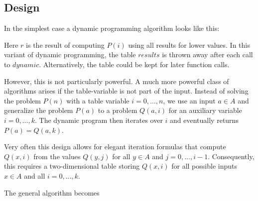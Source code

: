 \subsection{Design}

In the simplest case a dynamic programming algorithm looks like this:

\begin{acode}
\end{acode}

Here $r$ is the result of computing $P(i)$ using all results for lower values.
In this variant of dynamic programming, the table $results$ is thrown away after each call to $dynamic$.
Alternatively, the table could be kept for later function calls.

However, this is not particularly powerful.
A much more powerful class of algorithms arises if the table-variable is not part of the input.
Instead of solving the problem $P(n)$ with a table variable $i=0,\ldots,n$, we use an input $a\in A$ and generalize the problem $P(a)$ to a problem $Q(a,i)$ for an auxiliary variable $i=0,\ldots, k$.
The dynamic program then iterates over $i$ and eventually returns $P(a)=Q(a,k)$.

Very often this design allows for elegant iteration formulas that compute $Q(x,i)$ from the values $Q(y,j)$ for all $y\in A$ and $j=0,\ldots,i-1$.
Consequently, this requires a two-dimensional table storing $Q(x,i)$ for all possible inputs $x\in A$ and all $i=0,\ldots, k$.

The general algorithm becomes
\begin{acode}
\end{acode}

